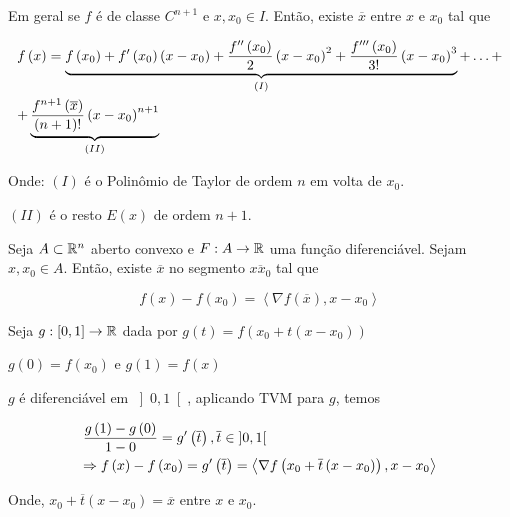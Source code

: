 \documentclass{book}
\begin{document}
Em geral se $f$ \'e de classe $C^{n+1}$ e $x,x_0 \in I$. Ent\~ao, existe $\overline x$ entre $x$ e $x_0$ tal que

\[
\begin{gathered}
  f\left( x \right) = \underbrace {f\left( {x_0 } \right) + f'\left( {x_0 } \right)\left( {x - x_0 } \right) + \frac{{f''\left( {x_0 } \right)}}
{2}\left( {x - x_0 } \right)^2  + \frac{{f'''\left( {x_0 } \right)}}
{{3!}}\left( {x - x_0 } \right)^3 }_{\left( I \right)} + \ldots + \hfill \\
  + \underbrace {\frac{{f^{n + 1} \left( {\overline x } \right)}}{{\left( {n + 1} \right)!}}\left( {x - x_0 } \right)^{n + 1} }_{\left( {II} \right)} \hfill \\ 
\end{gathered} 
\]

Onde: $(I)$ \'e o Polin\^omio de Taylor de ordem $n$ em volta de $x_0$.

$(II)$ \'e o resto $E(x)$ de ordem $n+1$.

\begin{teo} \label{tvm2}
\begin{sloppypar}
Seja $A \subset \mathbb{R}^n$ aberto convexo e ${F:A \to \mathbb{R}}$ uma fun\c c\~ao diferenci\'avel. Sejam $x,x_0 \in A$. Ent\~ao, existe $\overline x$ no segmento $\overline {xx_0}$ tal que
\end{sloppypar}

\[
f\left( x \right) - f\left( {x_0 } \right) = \left\langle {\nabla f\left( {\overline x } \right),x - x_0 } \right\rangle
\]

\end{teo}

\begin{dem}
    Seja $g:\left[ {0,1} \right] \to \mathbb{R}$ dada por $g\left( t \right) = f\left( {x_0  + t\left( {x - x_0 } \right)} \right)$

    $g\left( 0 \right) = f\left( {x_0 } \right)$ e $g\left( 1 \right) = f\left( x \right)$

$g$ \'e diferenci\'avel em $\left] {0,1} \right[$, aplicando TVM para $g$, temos

\[
\begin{gathered}
\frac{{g\left( 1 \right) - g\left( 0 \right)}}
{{1 - 0}} = g'\left( {\overline t } \right),\overline t  \in \left] {0,1} \right[ \hfill \\
   \Rightarrow f\left( x \right) - f\left( {x_0 } \right) = g'\left( {\overline t } \right) = \left\langle {\nabla f\left( {x_0  + \overline t \left( {x - x_0 } \right)} \right),x - x_0 } \right\rangle  \hfill \\
\end{gathered}
\]

    Onde, $x_0  + \overline t \left( {x - x_0 } \right) = \overline x$ entre $x$ e $x_0$.
\end{dem}
\end{document}
